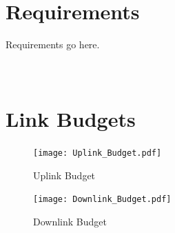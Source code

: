 \documentclass[12pt]{article}
\begin{document}
	

\newpage
\appendix
\section{\\Requirements} \label{app:requirements}
Requirements go here.

\newpage
\section{\\Link Budgets} \label{app:link_budgets}

\begin{figure}[ht]
\centering 
\caption{Uplink Budget}
\texttt{[image: Uplink\_Budget.pdf]}
\end{figure}

\begin{figure}[ht]
\centering 
\caption{Downlink Budget}
\texttt{[image: Downlink\_Budget.pdf]}
\end{figure}


\newpage
\end{document}
